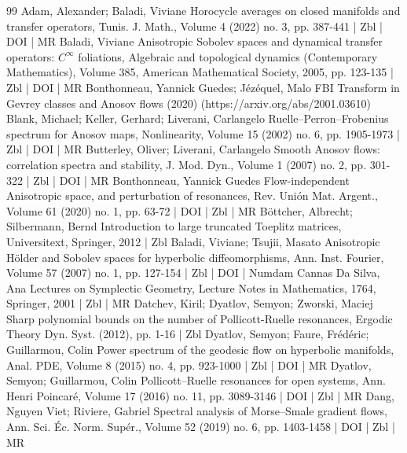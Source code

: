 \begin{thebibliography}{99}
Adam, Alexander; Baladi, Viviane Horocycle averages on closed manifolds and transfer operators, Tunis. J. Math., Volume 4 (2022) no. 3, pp. 387-441 | Zbl | DOI | MR
Baladi, Viviane Anisotropic Sobolev spaces and dynamical transfer operators: ${C}^\infty $ foliations, Algebraic and topological dynamics (Contemporary Mathematics), Volume 385, American Mathematical Society, 2005, pp. 123-135 | Zbl | DOI | MR
Bonthonneau, Yannick Guedes; Jézéquel, Malo FBI Transform in Gevrey classes and Anosov flows (2020) (https://arxiv.org/abs/2001.03610)
Blank, Michael; Keller, Gerhard; Liverani, Carlangelo Ruelle–Perron–Frobenius spectrum for Anosov maps, Nonlinearity, Volume 15 (2002) no. 6, pp. 1905-1973 | Zbl | DOI | MR
Butterley, Oliver; Liverani, Carlangelo Smooth Anosov flows: correlation spectra and stability, J. Mod. Dyn., Volume 1 (2007) no. 2, pp. 301-322 | Zbl | DOI | MR
Bonthonneau, Yannick Guedes Flow-independent Anisotropic space, and perturbation of resonances, Rev. Unión Mat. Argent., Volume 61 (2020) no. 1, pp. 63-72 | DOI | Zbl | MR
Böttcher, Albrecht; Silbermann, Bernd Introduction to large truncated Toeplitz matrices, Universitext, Springer, 2012 | Zbl
Baladi, Viviane; Tsujii, Masato Anisotropic Hölder and Sobolev spaces for hyperbolic diffeomorphisms, Ann. Inst. Fourier, Volume 57 (2007) no. 1, pp. 127-154 | Zbl | DOI | Numdam
Cannas Da Silva, Ana Lectures on Symplectic Geometry, Lecture Notes in Mathematics, 1764, Springer, 2001 | Zbl | MR
Datchev, Kiril; Dyatlov, Semyon; Zworski, Maciej Sharp polynomial bounds on the number of Pollicott-Ruelle resonances, Ergodic Theory Dyn. Syst. (2012), pp. 1-16 | Zbl
Dyatlov, Semyon; Faure, Frédéric; Guillarmou, Colin Power spectrum of the geodesic flow on hyperbolic manifolds, Anal. PDE, Volume 8 (2015) no. 4, pp. 923-1000 | Zbl | DOI | MR
Dyatlov, Semyon; Guillarmou, Colin Pollicott–Ruelle resonances for open systems, Ann. Henri Poincaré, Volume 17 (2016) no. 11, pp. 3089-3146 | DOI | Zbl | MR
Dang, Nguyen Viet; Riviere, Gabriel Spectral analysis of Morse–Smale gradient flows, Ann. Sci. Éc. Norm. Supér., Volume 52 (2019) no. 6, pp. 1403-1458 | DOI | Zbl | MR

\end{thebibliography}
